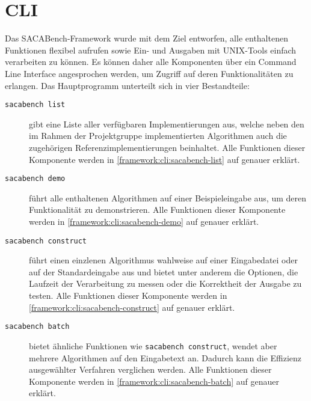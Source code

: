 \section{CLI}

\newcommand{\sacabench}{SACABench\xspace}
\newcommand{\termfont}[1]{\texttt{#1}}

Das  \sacabench-Framework wurde mit dem Ziel entworfen, alle enthaltenen Funktionen flexibel aufrufen sowie Ein- und Ausgaben mit UNIX-Tools einfach verarbeiten zu können.
Es können daher alle Komponenten über ein Command Line Interface angesprochen werden, um Zugriff auf deren Funktionalitäten zu erlangen.
Das Hauptprogramm unterteilt sich in vier Bestandteile:
\begin{description}
    \item[\termfont{sacabench list}] gibt eine Liste aller verfügbaren Implementierungen aus, welche neben den im Rahmen der Projektgruppe implementierten Algorithmen auch die zugehörigen Referenzimplementierungen beinhaltet.
        Alle Funktionen dieser Komponente werden in \cref{framework:cli:sacabench-list} auf  genauer erklärt.
    \item[\termfont{sacabench demo}] führt alle enthaltenen Algorithmen auf einer Beispieleingabe aus, um deren Funktionalität zu demonstrieren.
        Alle Funktionen dieser Komponente werden in \cref{framework:cli:sacabench-demo} auf  genauer erklärt.
    \item[\termfont{sacabench construct}] führt einen einzlenen Algorithmus wahlweise auf einer Eingabedatei oder auf der Standardeingabe aus und bietet unter anderem die Optionen, die Laufzeit der Verarbeitung zu messen oder die Korrektheit der Ausgabe zu testen. Alle Funktionen dieser Komponente werden in \cref{framework:cli:sacabench-construct} auf  genauer erklärt.
    \item[\termfont{sacabench batch}] bietet ähnliche Funktionen wie \termfont{sacabench construct}, wendet aber mehrere Algorithmen auf den Eingabetext an. Dadurch kann die Effizienz ausgewählter Verfahren verglichen werden. Alle Funktionen dieser Komponente werden in \cref{framework:cli:sacabench-batch} auf  genauer erklärt.
\end{description}






